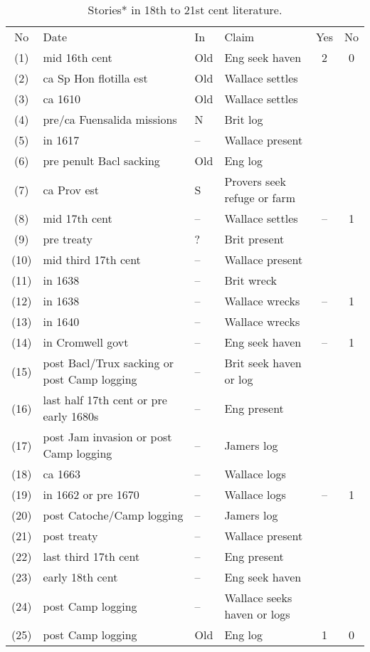 \begin{table} %
\caption{Stories* in 18th to 21st cent literature.}
\label{tab:literature}
\begin{sideways}
\begin{tabular}{cp{.4\textheight}lp{.3\textheight}cc}
No	&Date	&In	&Claim	&Yes	&No\\
(1)	&mid 16th cent	&Old	&Eng seek haven	&2	&0\\ %
(2)	&ca Sp Hon flotilla est	&Old	&Wallace settles	&	&\\ %
(3)	&ca 1610	&Old&Wallace settles	&&\\ %
(4)	&pre/ca Fuensalida missions	&N	&Brit log	&&\\ %
(5)	&in 1617	&--	&Wallace present&&\\ %
(6)	&pre penult Bacl sacking	&Old	&Eng log	&&\\ %
(7)	&ca Prov est	&S	&Provers seek refuge or farm	&&\\ %
(8)	&mid 17th cent	&--	&Wallace settles	&--	&1\\ %
(9)	&pre treaty	&?	&Brit present	&&\\ %
(10)	&mid third 17th cent	&--	&Wallace present	&&\\ %
(11)	&in 1638	&--	&Brit wreck	&&\\ %
(12)	&in 1638	&--	&Wallace wrecks	&--	&1\\ %
(13)	&in 1640	&--	&Wallace wrecks	&&\\ %
(14)	&in Cromwell govt	&--	&Eng seek haven	&--	&1\\ %
(15)	&post Bacl/Trux sacking or post Camp logging	&--	&Brit seek haven or log	&&\\ %
(16)	&last half 17th cent or pre early 1680s	&--	&Eng present	&&\\ %
(17)	&post Jam invasion or post Camp logging	&--	&Jamers log	&&\\ %
(18)	&ca 1663	&--	&Wallace logs	&&\\ %
(19)	&in 1662	 or pre 1670&--	&Wallace logs	&--	&1\\ %
(20)	&post Catoche/Camp logging	&--	&Jamers log	&&\\ %
(21)	&post treaty	&--	&Wallace present	&&\\ %
(22)	&last third 17th cent	&--	&Eng present	&&\\ %
(23)	&early 18th cent	&--	&Eng seek haven	&&\\ %
(24)	&post Camp logging	&--	&Wallace seeks haven or logs	&&\\ %
(25)	&post Camp logging	&Old	&Eng log	&1	&0 %
\end{tabular}
\end{sideways}
\end{table}
%
